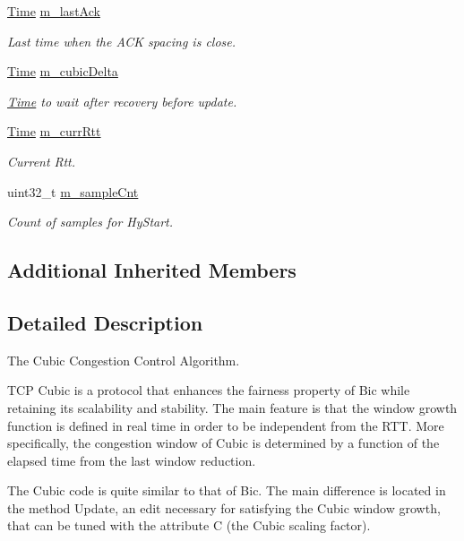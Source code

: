 \begin{DoxyCompactItemize}
\hyperlink{classns3_1_1Time}{Time} \hyperlink{classns3_1_1TcpCubic_a735cbf51912a83d6c1a75d07879ce69e}{m\+\_\+last\+Ack}
\begin{DoxyCompactList}\small\item\em Last time when the A\+CK spacing is close. \end{DoxyCompactList}\item 
\hyperlink{classns3_1_1Time}{Time} \hyperlink{classns3_1_1TcpCubic_a10b3b2aedb75eb85ecf5e339462def08}{m\+\_\+cubic\+Delta}
\begin{DoxyCompactList}\small\item\em \hyperlink{classns3_1_1Time}{Time} to wait after recovery before update. \end{DoxyCompactList}\item 
\hyperlink{classns3_1_1Time}{Time} \hyperlink{classns3_1_1TcpCubic_a0082d2bc456e29345d611b313091bbab}{m\+\_\+curr\+Rtt}
\begin{DoxyCompactList}\small\item\em Current Rtt. \end{DoxyCompactList}\item 
uint32\+\_\+t \hyperlink{classns3_1_1TcpCubic_a189a416124fb57d08f10b40bbdb43394}{m\+\_\+sample\+Cnt}
\begin{DoxyCompactList}\small\item\em Count of samples for Hy\+Start. \end{DoxyCompactList}\end{DoxyCompactItemize}
\subsection*{Additional Inherited Members}


\subsection{Detailed Description}
The Cubic Congestion Control Algorithm. 

T\+CP Cubic is a protocol that enhances the fairness property of Bic while retaining its scalability and stability. The main feature is that the window growth function is defined in real time in order to be independent from the R\+TT. More specifically, the congestion window of Cubic is determined by a function of the elapsed time from the last window reduction.

The Cubic code is quite similar to that of Bic. The main difference is located in the method Update, an edit necessary for satisfying the Cubic window growth, that can be tuned with the attribute C (the Cubic scaling factor).

